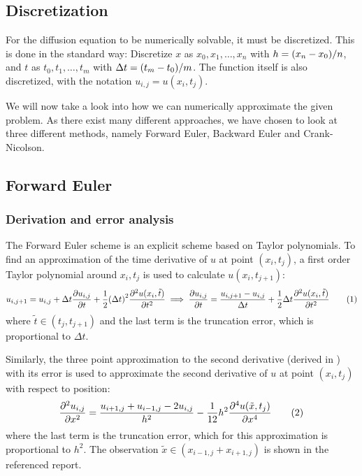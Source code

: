 \documentclass[12pt,english,a4paper]{article}
\newcommand{\eqtag}[1]{\refstepcounter{equation}\tag{\theequation}\label{#1}}
\begin{document}
\subsection{Discretization}

For the diffusion equation to be numerically solvable, it must be discretized. This is done in the standard way: Discretize \(x\) as \(x_0,x_1,\dots,x_n\) with \(h=\qty(x_n-x_0)/n\), and \(t\) as \(t_0,t_1,\dots,t_m\) with \(\Delta t = \qty(t_m-t_0)/m\). The function itself is also discretized, with the notation \(u_{i,j} = u(x_i,t_j)\).

We will now take a look into how we can numerically approximate the given problem. As there exist many different approaches, we have chosen to look at three different methods, namely Forward Euler, Backward Euler and Crank-Nicolson.
%
\subsection{Forward Euler}

\subsubsection{Derivation and error analysis}\label{sec:ForwardEulerDerivation}
The Forward Euler scheme is an explicit scheme based on Taylor polynomials. To find an approximation of the time derivative of \(u\) at point \((x_i,t_j)\), a first order Taylor polynomial around \(x_i,t_j\) is used to calculate \(u(x_i,t_{j+1})\):
\[
    u_{i,j+1} = u_{i,j} + \Delta t\pdv{u_{i,j}}{t} + \frac{1}{2}\qty(\Delta t)^2\pdv[2]{u(x_i,\tilde{t})}{t}
    \implies \pdv{u_{i,j}}{t} = \frac{u_{i,j+1}-u_{i,j}}{\Delta t} + \frac{1}{2}\Delta t\pdv[2]{u(x_i,\tilde{t})}{t}\eqtag{asymmnewton}
\]
where \(\tilde{t}\in(t_j,t_{j+1})\) and the last term is the truncation error, which is proportional to \(\Delta t\).

Similarly, the three point approximation to the second derivative (derived in \autocite{oblig1}) with its error is used to approximate the second derivative of \(u\) at point \((x_i,t_j)\) with respect to position:
\[
    \pdv[2]{u_{i,j}}{x} = \frac{u_{i+1,j} + u_{i-1,j} - 2u_{i,j}}{h^2} - \frac{1}{12}h^2\pdv[4]{u(\tilde{x},t_j)}{x}\eqtag{andrederivert}
\]
where the last term is the truncation error, which for this approximation is proportional to \(h^2\). The observation \(\tilde{x}\in(x_{i-1,j} + x_{i+1,j})\) is shown in the referenced report.
\end{document}
